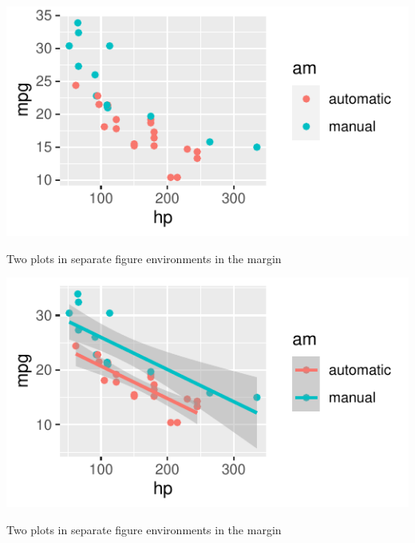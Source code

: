 \documentclass[
  letterpaper,
  DIV=11,
  numbers=noendperiod,
  oneside]{scrartcl}
\begin{document}
\begin{marginfigure}

{\centering \includegraphics{HousePrices_files/figure-pdf/fig-margin-separate-a-1.pdf}

}

\caption{\label{fig-margin-separate-a-1}Two plots in separate figure
environments in the margin}

\end{marginfigure}

\begin{marginfigure}

{\centering \includegraphics{HousePrices_files/figure-pdf/fig-margin-separate-a-2.pdf}

}

\caption{\label{fig-margin-separate-a-2}Two plots in separate figure
environments in the margin}

\end{marginfigure}
\end{document}
